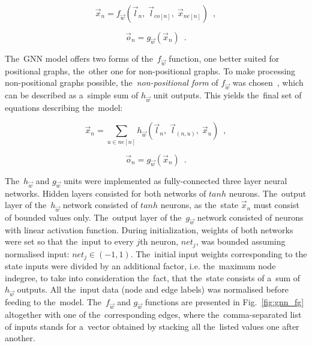\documentclass{llncs}
\begin{document}
\begin{equation}
\vec{x}_n = f_{\vec{w}}(\vec{l}_n, \; \vec{l}_{co[n]}, \; \vec{x}_{ne[n]}) \enspace ,
\label{eq:gnn_fmin}
\end{equation}

\begin{equation}
\vec{o}_n = g_{\vec{w}}(\vec{x}_n) \enspace .
\label{eq:gnn_gmin}
\end{equation}

\noindent The~GNN model offers two forms of the~$f_{\vec{w}}$ function, one better suited for positional graphs, the~other one for non-positional graphs. To make processing non-positional graphs possible, the~\emph{non-positional form} of $f_{\vec{w}}$ was chosen~\cite{scarselli2009graph}, which can be described as a~simple sum of $h_{\vec{w}}$ unit outputs. This yields the~final set of equations describing the~model:

\begin{equation}
\vec{x}_n = \sum_{u \in ne[n]}h_{\vec{w}}(\vec{l}_n, \; \vec{l}_{(n,u)}, \; \vec{x}_{u}) \enspace ,
\label{eq:gnn_ffinal}
\end{equation}

\begin{equation}
\vec{o}_n = g_{\vec{w}}(\vec{x}_n) \enspace .
\label{eq:gnn_gfinal}
\end{equation}

\noindent The~$h_{\vec{w}}$ and $g_{\vec{w}}$ units were implemented as fully-connected three layer neural networks. Hidden layers consisted for both networks of $tanh$ neurons. The~output layer of the~$h_{\vec{w}}$ network consisted of $tanh$ neurons, as the~state $\vec{x}_n$ must consist of bounded values only. The~output layer of the~$g_{\vec{w}}$ network consisted of neurons with linear activation function. During initialization, weights of both networks were set so that the~input to every $j$th neuron, $net_j$, was bounded assuming normalised input: $net_j \in (-1, 1)$. The~initial input weights corresponding to the state inputs were divided by an additional factor, i.e. the~maximum node indegree, to take into consideration the~fact, that the~state consists of a~sum of $h_{\vec{w}}$ outputs. All the~input data (node and edge labels) was normalised before feeding to the~model. The~$f_{\vec{w}}$ and $g_{\vec{w}}$ functions are presented in Fig.~\ref{fig:gnn_fg} altogether with one of the~corresponding edges, where the~comma-separated list of inputs stands for a~vector obtained by stacking all the~listed values one after another.
\end{document}
